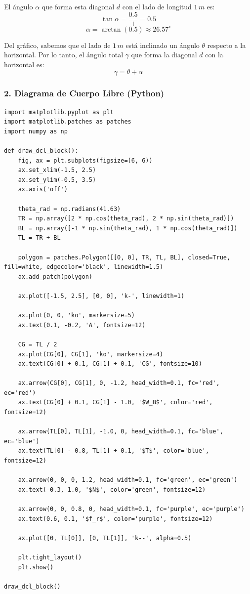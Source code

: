 \documentclass[12pt, a4paper]{article}
\begin{document}
El ángulo $\alpha$ que forma esta diagonal $d$ con el lado de longitud $1 \, \si{m}$ es:
$$\tan \alpha = \frac{0.5}{1} = 0.5$$
$$\alpha = \arctan(0.5) \approx 26.57^\circ$$

Del gráfico, sabemos que el lado de $1 \, \si{m}$ está inclinado un ángulo $\theta$ respecto a la horizontal. Por lo tanto, el ángulo total $\gamma$ que forma la diagonal $d$ con la horizontal es:
$$\gamma = \theta + \alpha$$

\subsubsection*{2. Diagrama de Cuerpo Libre (Python)}

\begin{lstlisting}
import matplotlib.pyplot as plt
import matplotlib.patches as patches
import numpy as np

def draw_dcl_block():
    fig, ax = plt.subplots(figsize=(6, 6))
    ax.set_xlim(-1.5, 2.5)
    ax.set_ylim(-0.5, 3.5)
    ax.axis('off')

    theta_rad = np.radians(41.63)
    TR = np.array([2 * np.cos(theta_rad), 2 * np.sin(theta_rad)])
    BL = np.array([-1 * np.sin(theta_rad), 1 * np.cos(theta_rad)])
    TL = TR + BL

    polygon = patches.Polygon([[0, 0], TR, TL, BL], closed=True, fill=white, edgecolor='black', linewidth=1.5)
    ax.add_patch(polygon)

    ax.plot([-1.5, 2.5], [0, 0], 'k-', linewidth=1)

    ax.plot(0, 0, 'ko', markersize=5)
    ax.text(0.1, -0.2, 'A', fontsize=12)

    CG = TL / 2
    ax.plot(CG[0], CG[1], 'ko', markersize=4)
    ax.text(CG[0] + 0.1, CG[1] + 0.1, 'CG', fontsize=10)

    ax.arrow(CG[0], CG[1], 0, -1.2, head_width=0.1, fc='red', ec='red')
    ax.text(CG[0] + 0.1, CG[1] - 1.0, '$W_B$', color='red', fontsize=12)

    ax.arrow(TL[0], TL[1], -1.0, 0, head_width=0.1, fc='blue', ec='blue')
    ax.text(TL[0] - 0.8, TL[1] + 0.1, '$T$', color='blue', fontsize=12)

    ax.arrow(0, 0, 0, 1.2, head_width=0.1, fc='green', ec='green')
    ax.text(-0.3, 1.0, '$N$', color='green', fontsize=12)

    ax.arrow(0, 0, 0.8, 0, head_width=0.1, fc='purple', ec='purple')
    ax.text(0.6, 0.1, '$f_r$', color='purple', fontsize=12)
    
    ax.plot([0, TL[0]], [0, TL[1]], 'k--', alpha=0.5)

    plt.tight_layout()
    plt.show()

draw_dcl_block()
\end{lstlisting}
\end{document}
